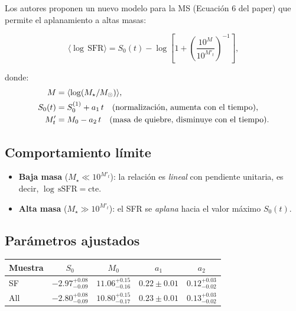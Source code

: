 \documentclass[12pt, a4paper]{article}
\begin{document}
Los autores proponen un nuevo modelo para la MS (Ecuación 6 del paper)
que permite el aplanamiento a altas masas:

\begin{equation}
    \langle\log\,\text{SFR}\rangle = S_0(t) - \log\!\left[1 +
    \left(\frac{10^M}{10^{M'_t}}\right)^{-1}\right],
    \label{eq:ms}
\end{equation}

donde:
\begin{align}
    M &= \langle\log(M_\star/M_\odot)\rangle, \notag\\
    S_0(t) &= S_0^{(1)} + a_1\,t \quad \text{(normalización, aumenta con el tiempo)},\notag\\
    M'_t &= M_0 - a_2\,t \quad \text{(masa de quiebre, disminuye con el tiempo)}.\notag
\end{align}

\subsection{Comportamiento límite}

\begin{itemize}[leftmargin=2em]
    \item \textbf{Baja masa} ($M_\star \ll 10^{M'_t}$):
          la relación es \textit{lineal} con pendiente unitaria,
          es decir, $\log\,\text{sSFR} = \text{cte}$.
    \item \textbf{Alta masa} ($M_\star \gg 10^{M'_t}$):
          el SFR se \textit{aplana} hacia el valor máximo $S_0(t)$.
\end{itemize}

\subsection{Parámetros ajustados}

\begin{center}
\begin{tabular}{lcccc}
\toprule
\textbf{Muestra} & $S_0$ & $M_0$ & $a_1$ & $a_2$ \\
\midrule
SF   & $-2.97^{+0.08}_{-0.09}$ & $11.06^{+0.15}_{-0.16}$
     & $0.22\pm0.01$ & $0.12^{+0.03}_{-0.02}$ \\[4pt]
All  & $-2.80^{+0.08}_{-0.09}$ & $10.80^{+0.15}_{-0.17}$
     & $0.23\pm0.01$ & $0.13^{+0.03}_{-0.02}$ \\
\bottomrule
\end{tabular}
\end{center}
\end{document}

